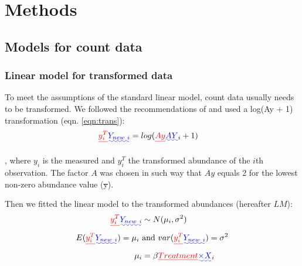 \documentclass[twocolumn, natbib]{svjour3}
\providecommand{\DIFadd}[1]{{\protect\color{blue}\uwave{#1}}} %
\providecommand{\DIFdel}[1]{{\protect\color{red}\sout{#1}}}                      %
\providecommand{\DIFaddbegin}{} %
\providecommand{\DIFaddend}{} %
\providecommand{\DIFdelbegin}{} %
\providecommand{\DIFdelend}{} %
\begin{document}
\section{Methods}
\label{sec:methods}

\subsection{Models for count data}
\label{ssec:counts}
\subsubsection{Linear model for transformed data}
To meet the assumptions of the standard linear model, count data usually needs to be transformed. 
We followed the recommendations of \citet{van_den_brink_impact_2000} and used a log(Ay + 1) transformation (eqn. \ref{eqn:trans}):
\begin{align}
  \DIFdelbegin \DIFdel{y_i^T }\DIFdelend \DIFaddbegin \DIFadd{Y_{new~i} }\DIFaddend & = log(\DIFdelbegin \DIFdel{Ay}\DIFdelend \DIFaddbegin \DIFadd{AY}\DIFaddend _i + 1) \label{eqn:trans}
\end{align}

, where \DIFdelbegin \DIFdel{$y_i$ }\DIFdelend \DIFaddbegin \DIFadd{$Y_i$ }\DIFaddend is the measured and \DIFdelbegin \DIFdel{$y_i^T$ }\DIFdelend \DIFaddbegin \DIFadd{$Y_{new~i}$ }\DIFaddend the transformed abundance of the $i$th observation. 
The factor $A$ was chosen in such way that \DIFdelbegin \DIFdel{$Ay$ }\DIFdelend \DIFaddbegin \DIFadd{$AY$ }\DIFaddend equals 2 for the lowest non-zero abundance value (\DIFdelbegin \DIFdel{y}\DIFdelend \DIFaddbegin \DIFadd{Y}\DIFaddend ).

Then we fitted the linear model to the transformed abundances (hereafter $LM$):
\begin{align}
  \DIFdelbegin \DIFdel{y_i^T }\DIFdelend \DIFaddbegin \DIFadd{Y_{new~i} }\DIFaddend &\sim N(\mu_i, \sigma^2) \nonumber \\
  E(\DIFdelbegin \DIFdel{y_i^T}\DIFdelend \DIFaddbegin \DIFadd{Y_{new~i}}\DIFaddend ) = \mu_i ~&\text{and}~ var(\DIFdelbegin \DIFdel{y_i^T}\DIFdelend \DIFaddbegin \DIFadd{Y_{new~i}}\DIFaddend ) = \sigma^2 \label{eqn:normal} \\
  \mu_i &= \beta \DIFdelbegin \DIFdel{Treatment}\DIFdelend \DIFaddbegin \DIFadd{\times X}\DIFaddend _i  \nonumber
\end{align}
\end{document}
